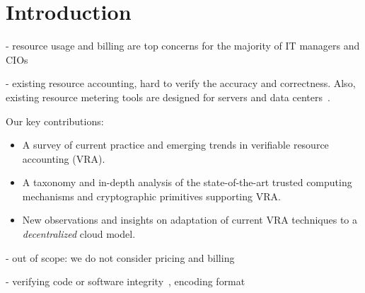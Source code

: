 \section{Introduction} \label{sect:intro}

- resource usage and billing are top concerns for the majority of IT managers and CIOs 

- existing resource accounting, hard to verify the accuracy and correctness. Also, existing resource metering tools are designed for servers and data centers~\cite{?}.

Our key contributions:
\begin{itemize}
 \item A survey of current practice and emerging trends in verifiable resource accounting (VRA).
 \item A taxonomy and in-depth analysis of the state-of-the-art trusted computing mechanisms and cryptographic primitives supporting VRA.
 \item New observations and insights on adaptation of current VRA techniques to a {\em decentralized} cloud model.
\end{itemize} 



- out of scope: we do not consider pricing and billing

- verifying code or software integrity~\cite{SLS05,SMV+10}, encoding format~\cite{DJO+12}